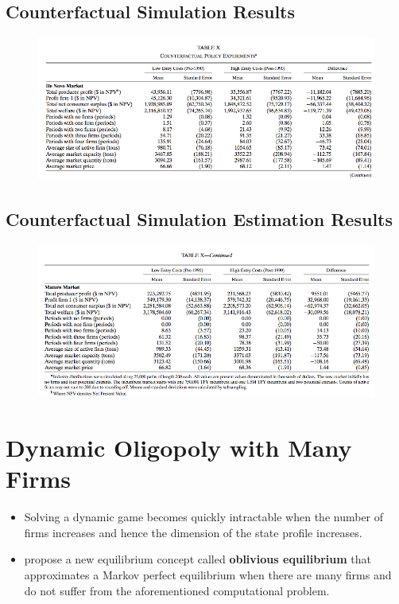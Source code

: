 \documentclass[]{book}
\providecommand{\tightlist}{%
  \setlength{\itemsep}{0pt}\setlength{\parskip}{0pt}}
\begin{document}
\subsection{Counterfactual Simulation
Results}\label{counterfactual-simulation-results}

\begin{figure}

{\centering \includegraphics[width=0.8\linewidth]{figuretable/denovo} 

}

\end{figure}

\subsection{Counterfactual Simulation Estimation
Results}\label{counterfactual-simulation-estimation-results}

\begin{figure}

{\centering \includegraphics[width=0.8\linewidth]{figuretable/mature} 

}

\end{figure}

\section{Dynamic Oligopoly with Many
Firms}\label{dynamic-oligopoly-with-many-firms}

\begin{itemize}
\tightlist
\item
  Solving a dynamic game becomes quickly intractable when the number of
  firms increases and hence the dimension of the state profile
  increases.
\item
  \citet{weintraubMarkovPerfectIndustry2008} propose a new equilibrium
  concept called \textbf{oblivious equilibrium} that approximates a
  Markov perfect equilibrium when there are many firms and do not suffer
  from the aforementioned computational problem.
\end{itemize}
\end{document}

